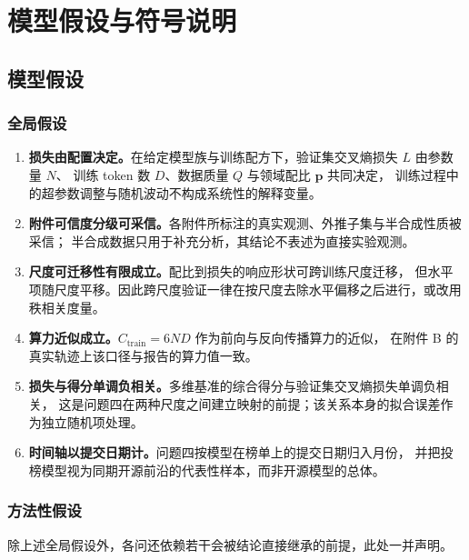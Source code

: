 \section{模型假设与符号说明}
\label{sec:assumptions}

\subsection{模型假设}
\subsubsection{全局假设}
\begin{enumerate}[label=\textbf{A\arabic*.},leftmargin=2.6em,itemsep=2pt]
  \item \textbf{损失由配置决定。}在给定模型族与训练配方下，验证集交叉熵损失 $L$ 由参数量 $N$、
    训练 token 数 $D$、数据质量 $Q$ 与领域配比 $\boldsymbol{p}$ 共同决定，
    训练过程中的超参数调整与随机波动不构成系统性的解释变量。
  \item \textbf{附件可信度分级可采信。}各附件所标注的真实观测、外推子集与半合成性质被采信；
    半合成数据只用于补充分析，其结论不表述为直接实验观测。
  \item \textbf{尺度可迁移性有限成立。}配比到损失的响应形状可跨训练尺度迁移，
    但水平项随尺度平移。因此跨尺度验证一律在按尺度去除水平偏移之后进行，或改用秩相关度量。
  \item \textbf{算力近似成立。}$C_{\text{train}}=6ND$ 作为前向与反向传播算力的近似，
    在附件 B 的真实轨迹上该口径与报告的算力值一致。
  \item \textbf{损失与得分单调负相关。}多维基准的综合得分与验证集交叉熵损失单调负相关，
    这是问题四在两种尺度之间建立映射的前提；该关系本身的拟合误差作为独立随机项处理。
  \item \textbf{时间轴以提交日期计。}问题四按模型在榜单上的提交日期归入月份，
    并把投榜模型视为同期开源前沿的代表性样本，而非开源模型的总体。
\end{enumerate}

\subsubsection{方法性假设}
除上述全局假设外，各问还依赖若干会被结论直接继承的前提，此处一并声明。

